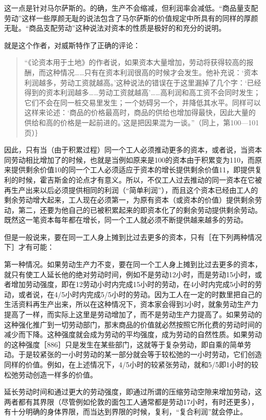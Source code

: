 这一点是针对马尔萨斯的。的确，生产不会缩减，但利润率会减低。“商品量支配劳动”这样一些厚颜无耻的说法包含了马尔萨斯的价值规定中所具有的同样的厚颜无耻。“商品支配劳动”这种说法对资本的性质是极好的和充分的说明。

就是这个作者，对威斯特作了正确的评论：

\begin{quote}{“《论资本用于土地》的作者说，如果资本大量增加，劳动将获得较高的报酬，而这种情况……只有在资本利润很高的时候才会发生。他补充说：‘资本利润越多，劳动工资就越高。’这种说法的错误在于这里漏掉了几个字：‘已经得到的资本利润越多……劳动工资就越高’……高利润和高工资不会同时发生；它们不会在同一桩交易里发生；一个妨碍另一个，并降低其水平。同样可以这样来论述：‘商品的价格最高时，商品的供给也增加得最快，因此大量的供给和高的价格是一起前进的。’这是把因果混为一谈。”（同上，第100—101页）｝}\end{quote}

因此，只有当（由于积累过程）同一个工人必须推动更多的资本，或者说，当资本同劳动相比增加了的时候，也就是当例如原来是100的资本由于积累变为110，而原来提供剩余价值10的同一个工人必须适应于资本的增长提供剩余价值11，即提供复利的时候，霍吉斯金的论点才有意义。所以，不仅工人过去推动的同一资本在它被再生产出来以后必须提供相同的利润（“简单利润”），而且这个资本已经由工人的剩余劳动增大起来，工人现在必须第一，为原有资本（或资本的价值）提供剩余劳动，第二，还要为他自己的已被积累起来的即资本化了的剩余劳动提供剩余劳动。既然这一笔资本每年都在增长，同一个工人就必须不断提供越来越多的劳动。

但是一般说来，要在同一工人身上摊到比过去更多的资本，只有［在下列两种情况下］才有可能：

第一种情况。如果劳动生产力不变，要在同一个工人身上摊到比过去更多的资本，就只有使工人延长他的绝对劳动时间，例如不是劳动12小时，而是劳动15小时，或者增加劳动强度，即在12劳动小时内完成15小时的劳动，在4小时内完成5小时的劳动，或者说，在4/5小时内完成5/5小时的劳动。因为工人在一定的时数里把自己的生活资料再生产出来，所以在这种情况下，资本家会得到3小时，就象劳动生产力提高了一样，而实际上这里是劳动增加了，而不是劳动生产力提高了。如果劳动的这种强化推广到一切劳动部门，那末商品的价值就必然按照它所化费的劳动时间的减少而下降。这种强度就会成为劳动的平均强度，成为劳动的自然性质。如果劳动的这种强度［886］只是发生在某些部门，这就等于复杂劳动，即自乘的简单劳动。于是较紧张的一小时劳动的某一部分就会等于较松弛的一小时劳动，它们创造同样的价值。例如，在上述情况下，4/5小时的较紧张劳动，就和5/5即1小时的较松弛劳动创造一样多的价值。

延长劳动时间和通过更大的劳动强度，即通过所谓的压缩劳动空隙来增加劳动，这两者都有其界限（尽管例如伦敦的面包工人通常都是劳动17小时，有时还更多），有十分明确的身体界限，而当达到界限的时候，复利，“复合利润”就会停止。

